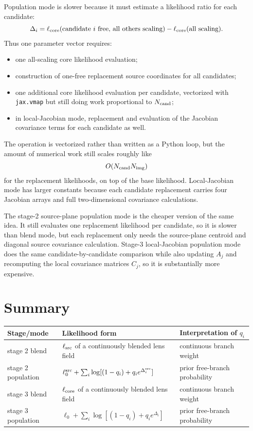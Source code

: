 \documentclass[11pt]{article}
\begin{document}
Population mode is slower because it must estimate a likelihood ratio for each
candidate:
\[
    \Delta_i =
    \ell_{\rm core}(\text{candidate }i\text{ free, all others scaling})
    -
    \ell_{\rm core}(\text{all scaling}).
\]
Thus one parameter vector requires:
\begin{itemize}
    \item one all-scaling core likelihood evaluation;
    \item construction of one-free replacement source coordinates for all
    candidates;
    \item one additional core likelihood evaluation per candidate, vectorized
    with \texttt{jax.vmap} but still doing work proportional to
    $N_{\rm cand}$;
    \item in local-Jacobian mode, replacement and evaluation of the Jacobian
    covariance terms for each candidate as well.
\end{itemize}
The operation is vectorized rather than written as a Python loop, but the
amount of numerical work still scales roughly like
\[
    O(N_{\rm cand}N_{\rm img})
\]
for the replacement likelihoods, on top of the base likelihood. Local-Jacobian
mode has larger constants because each candidate replacement carries four
Jacobian arrays and full two-dimensional covariance calculations.

The stage-2 source-plane population mode is the cheaper version of the same
idea. It still evaluates one replacement likelihood per candidate, so it is
slower than blend mode, but each replacement only needs the source-plane
centroid and diagonal source covariance calculation. Stage-3 local-Jacobian
population mode does the same candidate-by-candidate comparison while also
updating $A_j$ and recomputing the local covariance matrices $C_j$, so it is
substantially more expensive.

\section{Summary}

\begin{center}
\begin{tabular}{lll}
\toprule
Stage/mode & Likelihood form & Interpretation of $q_i$\\
\midrule
stage 2 blend &
$\ell_{\rm src}$ of a continuously blended lens field &
continuous branch weight\\
stage 2 population &
$\ell_0^{\rm src}+\sum_i\log[(1-q_i)+q_i e^{\Delta_i^{\rm src}}]$ &
prior free-branch probability\\
stage 3 blend &
$\ell_{\rm core}$ of a continuously blended lens field &
continuous branch weight\\
stage 3 population &
$\ell_0+\sum_i\log[(1-q_i)+q_i e^{\Delta_i}]$ &
prior free-branch probability\\
\bottomrule
\end{tabular}
\end{center}
\end{document}
